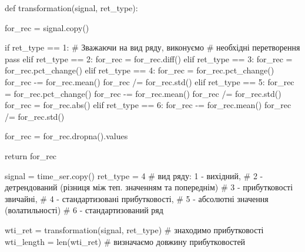 \documentclass[
  letterpaper,
]{report}
\newenvironment{Shaded}{\begin{snugshade}}{\end{snugshade}}
\newcommand{\BuiltInTok}[1]{\textcolor[rgb]{0.00,0.23,0.31}{#1}}
\newcommand{\CommentTok}[1]{\textcolor[rgb]{0.37,0.37,0.37}{#1}}
\newcommand{\ControlFlowTok}[1]{\textcolor[rgb]{0.00,0.23,0.31}{#1}}
\newcommand{\DecValTok}[1]{\textcolor[rgb]{0.68,0.00,0.00}{#1}}
\newcommand{\KeywordTok}[1]{\textcolor[rgb]{0.00,0.23,0.31}{#1}}
\newcommand{\NormalTok}[1]{\textcolor[rgb]{0.00,0.23,0.31}{#1}}
\newcommand{\OperatorTok}[1]{\textcolor[rgb]{0.37,0.37,0.37}{#1}}
\begin{document}
\begin{Shaded}
\begin{Highlighting}[]
\KeywordTok{def}\NormalTok{ transformation(signal, ret\_type):}

\NormalTok{    for\_rec }\OperatorTok{=}\NormalTok{ signal.copy()}

    \ControlFlowTok{if}\NormalTok{ ret\_type }\OperatorTok{==} \DecValTok{1}\NormalTok{:       }\CommentTok{\# Зважаючи на вид ряду, виконуємо}
                            \CommentTok{\# необхідні перетворення}
        \ControlFlowTok{pass}
    \ControlFlowTok{elif}\NormalTok{ ret\_type }\OperatorTok{==} \DecValTok{2}\NormalTok{:}
\NormalTok{        for\_rec }\OperatorTok{=}\NormalTok{ for\_rec.diff()}
    \ControlFlowTok{elif}\NormalTok{ ret\_type }\OperatorTok{==} \DecValTok{3}\NormalTok{:}
\NormalTok{        for\_rec }\OperatorTok{=}\NormalTok{ for\_rec.pct\_change()}
    \ControlFlowTok{elif}\NormalTok{ ret\_type }\OperatorTok{==} \DecValTok{4}\NormalTok{:}
\NormalTok{        for\_rec }\OperatorTok{=}\NormalTok{ for\_rec.pct\_change()}
\NormalTok{        for\_rec }\OperatorTok{{-}=}\NormalTok{ for\_rec.mean()}
\NormalTok{        for\_rec }\OperatorTok{/=}\NormalTok{ for\_rec.std()}
    \ControlFlowTok{elif}\NormalTok{ ret\_type }\OperatorTok{==} \DecValTok{5}\NormalTok{: }
\NormalTok{        for\_rec }\OperatorTok{=}\NormalTok{ for\_rec.pct\_change()}
\NormalTok{        for\_rec }\OperatorTok{{-}=}\NormalTok{ for\_rec.mean()}
\NormalTok{        for\_rec }\OperatorTok{/=}\NormalTok{ for\_rec.std()}
\NormalTok{        for\_rec }\OperatorTok{=}\NormalTok{ for\_rec.}\BuiltInTok{abs}\NormalTok{()}
    \ControlFlowTok{elif}\NormalTok{ ret\_type }\OperatorTok{==} \DecValTok{6}\NormalTok{:}
\NormalTok{        for\_rec }\OperatorTok{{-}=}\NormalTok{ for\_rec.mean()}
\NormalTok{        for\_rec }\OperatorTok{/=}\NormalTok{ for\_rec.std()}

\NormalTok{    for\_rec }\OperatorTok{=}\NormalTok{ for\_rec.dropna().values}

    \ControlFlowTok{return}\NormalTok{ for\_rec}
\end{Highlighting}
\end{Shaded}

\begin{Shaded}
\begin{Highlighting}[]
\NormalTok{signal }\OperatorTok{=}\NormalTok{ time\_ser.copy()}
\NormalTok{ret\_type }\OperatorTok{=} \DecValTok{4}    \CommentTok{\# вид ряду: 1 {-} вихідний, }
                \CommentTok{\# 2 {-} детрендований (різниця між теп. значенням та попереднім)}
                \CommentTok{\# 3 {-} прибутковості звичайні, }
                \CommentTok{\# 4 {-} стандартизовані прибутковості, }
                \CommentTok{\# 5 {-} абсолютні значення (волатильності)}
                \CommentTok{\# 6 {-} стандартизований ряд}

\NormalTok{wti\_ret }\OperatorTok{=}\NormalTok{ transformation(signal, ret\_type) }\CommentTok{\# знаходимо прибутковості }
\NormalTok{wti\_length }\OperatorTok{=} \BuiltInTok{len}\NormalTok{(wti\_ret)                  }\CommentTok{\# визначаємо довжину прибутковостей}
\end{Highlighting}
\end{Shaded}
\end{document}
